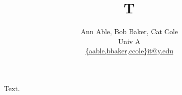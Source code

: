 \documentclass{article}
\title{T}
\author{Ann Able, Bob Baker, Cat Cole \\ Univ A \\ \href{mailto:x@y.edu}{\{aable,bbaker,ccole\}it@y.edu}}
\begin{document}
\maketitle
Text.
\end{document}
